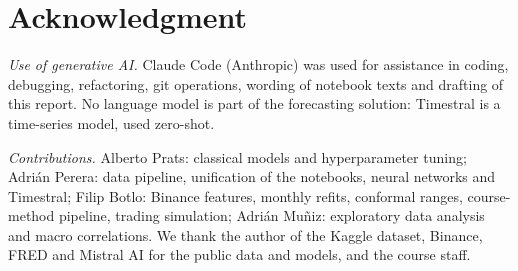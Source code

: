 \section*{Acknowledgment}

\emph{Use of generative AI.} Claude Code (Anthropic) was used for
assistance in coding, debugging, refactoring, git operations, wording of
notebook texts and drafting of this report. No language model is part of
the forecasting solution: Timestral is a time-series model, used
zero-shot.

\emph{Contributions.} Alberto Prats: classical models and hyperparameter
tuning; Adri\'an Perera: data pipeline, unification of the notebooks,
neural networks and Timestral; Filip Botlo: Binance features, monthly
refits, conformal ranges, course-method pipeline, trading simulation; Adri\'an Mu\~niz:
exploratory data analysis and macro correlations. We thank the author of
the Kaggle dataset, Binance, FRED and Mistral AI for the public data and
models, and the course staff.

